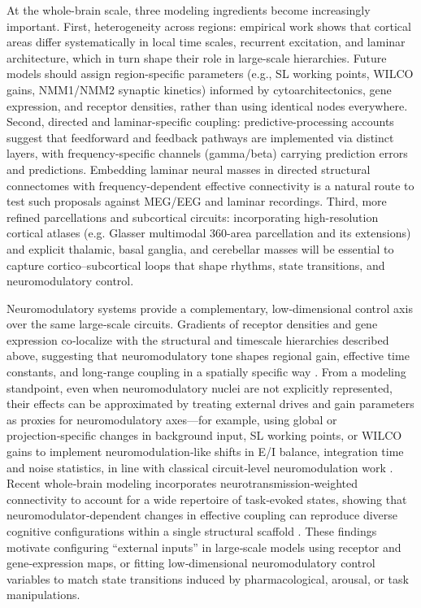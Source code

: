 \documentclass[12pt]{article}
\numberwithin{equation}{section}
\begin{document}
At the whole-brain scale, three modeling ingredients become increasingly important. First, heterogeneity across regions: empirical work shows that cortical areas differ systematically in local time scales, recurrent excitation, and laminar architecture, which in turn shape their role in large-scale hierarchies.\cite{mejiasFeedforwardFeedbackFrequencyDependent2016,rautOrganizationPropagatedIntrinsic2020} Future models should assign region-specific parameters (e.g., SL working points, WILCO gains, NMM1/NMM2 synaptic kinetics) informed by cytoarchitectonics, gene expression, and receptor densities, rather than using identical nodes everywhere. Second, directed and laminar-specific coupling: predictive-processing accounts suggest that feedforward and feedback pathways are implemented via distinct layers, with frequency-specific channels (gamma/beta) carrying prediction errors and predictions.\cite{bastosCanonicalMicrocircuitsPredictive2012, fristonFreeenergyPrincipleUnified2010} Embedding laminar neural masses in directed structural connectomes with frequency-dependent effective connectivity is a natural route to test such proposals against MEG/EEG and laminar recordings. Third, more refined parcellations and subcortical circuits: incorporating high-resolution cortical atlases (e.g. Glasser multimodal 360-area parcellation and its extensions)\cite{glasserMultiModalParcellationHuman2016} and explicit thalamic, basal ganglia, and cerebellar masses\cite{kringelbach_dynamic_2020,cofreWholeBrainModelsExplore2020,rautOrganizationPropagatedIntrinsic2020} will be essential to capture cortico–subcortical loops that shape rhythms, state transitions, and neuromodulatory control.

Neuromodulatory systems provide a complementary, low‑dimensional control axis over the same large‑scale circuits. Gradients of receptor densities and gene expression co‑localize with the structural and timescale hierarchies described above, suggesting that neuromodulatory tone shapes regional gain, effective time constants, and long‑range coupling in a spatially specific way \cite{demirtasHierarchicalHeterogeneityHuman2019,burtHierarchyTranscriptomicSpecialization2018}. From a modeling standpoint, even when neuromodulatory nuclei are not explicitly represented, their effects can be approximated by treating external drives and gain parameters as proxies for neuromodulatory axes—for example, using global or projection‑specific changes in background input, SL working points, or WILCO gains to implement neuromodulation‑like shifts in E/I balance, integration time and noise statistics, in line with classical circuit‑level neuromodulation work \cite{marderNeuromodulationNeuronalCircuits2012}. Recent whole‑brain modeling incorporates neurotransmission‑weighted connectivity to account for a wide repertoire of task‑evoked states, showing that neuromodulator‑dependent changes in effective coupling can reproduce diverse cognitive configurations within a single structural scaffold  \cite{decoEvolutionsBoldestTrick2025}. These findings motivate configuring “external inputs” in large‑scale models using receptor and gene‑expression maps, or fitting low‑dimensional neuromodulatory control variables to match state transitions induced by pharmacological, arousal, or task manipulations.
\end{document}
